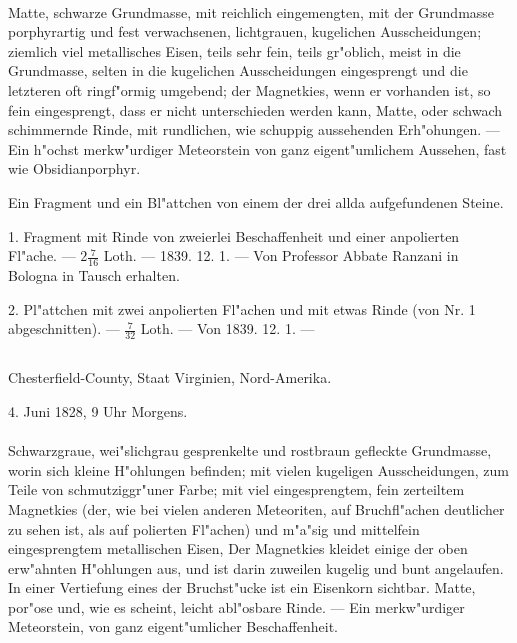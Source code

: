 \documentclass[a4paper, 11pt, oneside, polutonikogreek, german]{article}
\begin{document}
\paragraph{}
Matte, schwarze Grundmasse, mit reichlich eingemengten, mit der Grundmasse porphyrartig und fest verwachsenen, lichtgrauen, kugelichen Ausscheidungen; ziemlich viel metallisches Eisen, teils sehr fein, teils gr"oblich, meist in die Grundmasse, selten in die kugelichen Ausscheidungen eingesprengt und die letzteren oft ringf"ormig umgebend; der Magnetkies, wenn er vorhanden ist, so fein eingesprengt, dass er nicht unterschieden werden kann, Matte, oder schwach schimmernde Rinde, mit rundlichen, wie schuppig aussehenden Erh"ohungen. --- Ein h"ochst merkw"urdiger Meteorstein von ganz eigent"umlichem Aussehen, fast wie Obsidianporphyr.

Ein Fragment und ein Bl"attchen von einem der drei allda aufgefundenen Steine.

1. Fragment mit Rinde von zweierlei Beschaffenheit und einer anpolierten Fl"ache. --- $2\frac{7}{16}$ Loth. --- 1839. 12. 1. --- Von Professor Abbate Ranzani in Bologna in Tausch erhalten.

2. Pl"attchen mit zwei anpolierten Fl"achen und mit etwas Rinde (von Nr. 1 abgeschnitten). --- $\frac{7}{32}$ Loth. --- Von 1839. 12. 1. ---
\subsection{}
\begin{center}

Chesterfield-County, Staat Virginien, Nord-Amerika.

4. Juni 1828, 9 Uhr Morgens.
\end{center}
\paragraph{}
Schwarzgraue, wei"slichgrau gesprenkelte und rostbraun gefleckte Grundmasse, worin sich kleine H"ohlungen befinden; mit vielen kugeligen Ausscheidungen, zum Teile von schmutziggr"uner Farbe; mit viel eingesprengtem, fein zerteiltem Magnetkies (der, wie bei vielen anderen Meteoriten, auf Bruchfl"achen deutlicher zu sehen ist, als auf polierten Fl"achen) und m"a"sig und mittelfein eingesprengtem metallischen Eisen, Der Magnetkies kleidet einige der oben erw"ahnten H"ohlungen aus, und ist darin zuweilen kugelig und bunt angelaufen. In einer Vertiefung eines der Bruchst"ucke ist ein Eisenkorn sichtbar. Matte, por"ose und, wie es scheint, leicht abl"osbare Rinde. --- Ein merkw"urdiger Meteorstein, von ganz eigent"umlicher Beschaffenheit.
\end{document}
